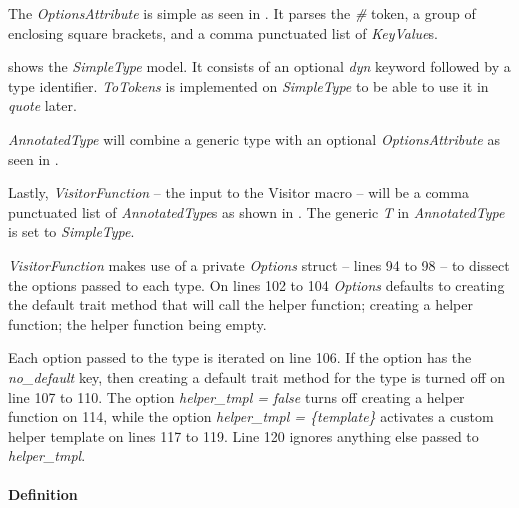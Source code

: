 
The \textit{OptionsAttribute} is simple as seen in .
It parses the \textit{\#} token, a group of enclosing square brackets, and a comma punctuated list of \textit{KeyValue}s.


 shows the \textit{SimpleType} model.
It consists of an optional \textit{dyn} keyword followed by a type identifier.
\textit{ToTokens} is implemented on \textit{SimpleType} to be able to use it in \textit{quote} later.


\textit{AnnotatedType} will combine a generic type with an optional \textit{OptionsAttribute} as seen in .



Lastly, \textit{VisitorFunction} -- the input to the Visitor macro -- will be a comma punctuated list of \textit{AnnotatedType}s as shown in .
The generic \textit{T} in \textit{AnnotatedType} is set to \textit{SimpleType}.


\textit{VisitorFunction} makes use of a private \textit{Options} struct -- lines 94 to 98 -- to dissect the options passed to each type.
On lines 102 to 104 \textit{Options} defaults to creating the default trait method that will call the helper function; creating a helper function; the helper function being empty.

Each option passed to the type is iterated on line 106.
If the option has the \textit{no\_default} key, then creating a default trait method for the type is turned off on line 107 to 110.
The option \textit{helper\_tmpl = false} turns off creating a helper function on 114, while the option \textit{helper\_tmpl = \{template\}} activates a custom helper template on lines 117 to 119.
Line 120 ignores anything else passed to \textit{helper\_tmpl}.

\paragraph{Definition}